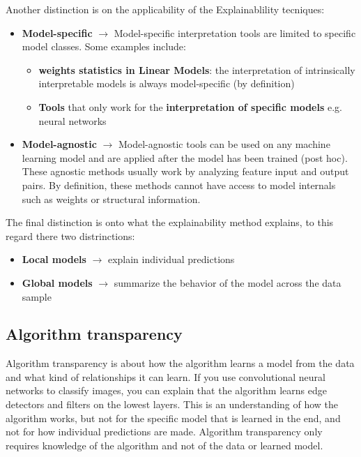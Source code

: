 Another distinction is on the applicability of the Explainablility tecniques:
\begin{itemize}
    \item \textbf{Model-specific} $\rightarrow$ Model-specific interpretation tools are limited to specific model classes. Some examples include: 
    \begin{itemize}
        \item \textbf{weights statistics in Linear Models}: the interpretation of intrinsically interpretable models is always model-specific (by definition)
        \item \textbf{Tools} that only work for the \textbf{interpretation of specific models} e.g. neural networks
    \end{itemize}
    \item \textbf{Model-agnostic} $\rightarrow$ Model-agnostic tools can be used on any machine learning model and are applied after the model has been trained (post hoc). 
    These agnostic methods usually work by analyzing feature input and output pairs. By definition, these methods cannot have access to model internals such as weights or 
    structural information.
\end{itemize}

The final distinction is onto what the explainability method explains, to this regard there two distrinctions:
\begin{itemize}
    \item \textbf{Local models} $\rightarrow$ explain individual predictions
    \item \textbf{Global models} $\rightarrow$ summarize the behavior of the model across the data sample
\end{itemize}

\subsection{Algorithm transparency}
Algorithm transparency is about how the algorithm learns a model from the data and what kind of relationships it can learn. 
If you use convolutional neural networks to classify images, you can explain that the algorithm learns edge detectors and 
filters on the lowest layers. This is an understanding of how the algorithm works, but not for the specific model that is 
learned in the end, and not for how individual predictions are made. Algorithm transparency only requires knowledge of the 
algorithm and not of the data or learned model.\\

